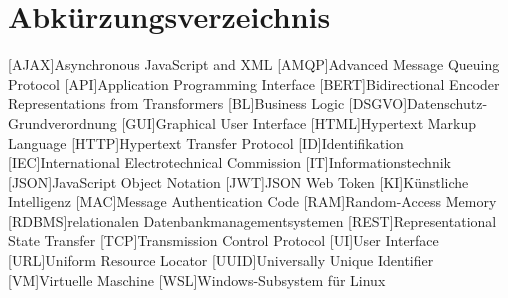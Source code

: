 \section{Abkürzungsverzeichnis}
\begin{acronym}[DSGVOO]
	[AJAX]{Asynchronous JavaScript and XML}
	[AMQP]{Advanced Message Queuing Protocol}
	[API]{Application Programming Interface}
	[BERT]{Bidirectional Encoder Representations from Transformers}
	[BL]{Business Logic}
	[DSGVO]{Datenschutz-Grundverordnung}
	[GUI]{Graphical User Interface}
	[HTML]{Hypertext Markup Language}
	[HTTP]{Hypertext Transfer Protocol}
	[ID]{Identifikation}
	[IEC]{International Electrotechnical Commission}
	[IT]{Informationstechnik}
	[JSON]{JavaScript Object Notation}
	[JWT]{JSON Web Token}
	[KI]{Künstliche Intelligenz}
	[MAC]{Message Authentication Code}
	[RAM]{Random-Access Memory}
	[RDBMS]{relationalen Datenbankmanagementsystemen}
	[REST]{Representational State Transfer}
	[TCP]{Transmission Control Protocol}
	[UI]{User Interface}
	[URL]{Uniform Resource Locator}
	[UUID]{Universally Unique Identifier}
	[VM]{Virtuelle Maschine}
	[WSL]{Windows-Subsystem für Linux}
	
\end{acronym}

